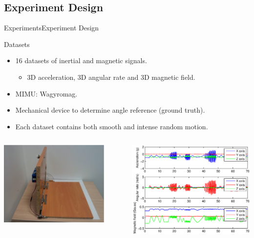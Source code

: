 \documentclass[10pt,aspectratio=1610]{beamer}
\begin{document}
\subsection{Experiment Design}
\label{subsec:experiment_design}
\begin{frame}{Experiments}{Experiment Design}
\begin{block}{Datasets}
\begin{itemize}
	\item 16 datasets of inertial and magnetic signals.
	\begin{itemize}
		\item 3D acceleration, 3D angular rate and 3D magnetic field.
	\end{itemize}
	\item MIMU: Wagyromag.
	\item Mechanical device to determine angle reference (ground truth).
	\item Each dataset contains both smooth and intense random motion.
\end{itemize}
\begin{columns}
\begin{column}{.5\textwidth}
\centering
\includegraphics[width=0.85\textwidth]{AAUgraphics/AngleDevice.eps}
\end{column}
\begin{column}{.5\textwidth}
\centering
\includegraphics[width=1\textwidth]{AAUgraphics/data_signals.eps}

\end{column}
\end{columns}
\end{block}
\end{frame}
\end{document}
